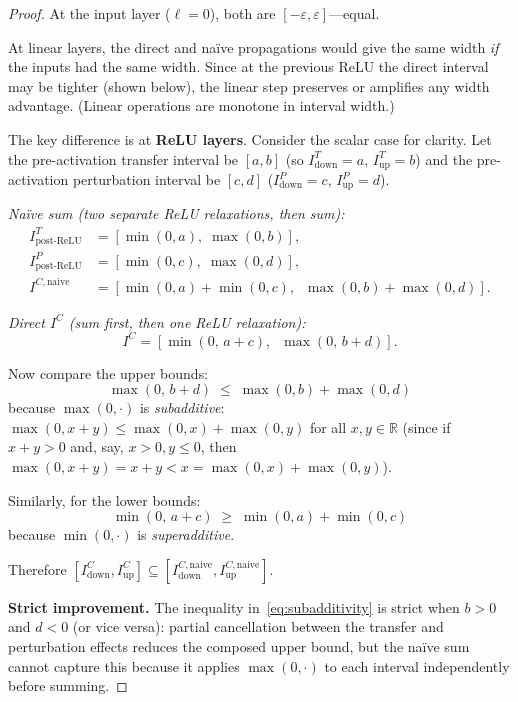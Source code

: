 \documentclass[11pt]{article}
\newcommand{\R}{\mathbb{R}}
\newcommand{\eps}{\varepsilon}
\newcommand{\layerl}{\ell}
\begin{document}
\begin{proof}
At the input layer ($\layerl = 0$), both are $[-\eps, \eps]$---equal.

At linear layers, the direct and na\"ive propagations would give the same
width \emph{if} the inputs had the same width. Since at the previous ReLU
the direct interval may be tighter (shown below), the linear step preserves
or amplifies any width advantage. (Linear operations are monotone in interval width.)

The key difference is at \textbf{ReLU layers}. Consider the scalar case
for clarity. Let the pre-activation transfer interval be $[a, b]$
(so $I^T_\text{down} = a$, $I^T_\text{up} = b$) and the pre-activation
perturbation interval be $[c, d]$ ($I^P_\text{down} = c$, $I^P_\text{up} = d$).

\emph{Na\"ive sum (two separate ReLU relaxations, then sum):}
\begin{align}
    I^T_\text{post-ReLU} &= [\min(0,a),\; \max(0,b)], \\
    I^P_\text{post-ReLU} &= [\min(0,c),\; \max(0,d)], \\
    I^{C,\text{naive}} &= [\min(0,a) + \min(0,c),\;\; \max(0,b) + \max(0,d)].
\end{align}

\emph{Direct $I^C$ (sum first, then one ReLU relaxation):}
\begin{equation}
    I^C = [\min(0,\, a+c),\;\; \max(0,\, b+d)].
\end{equation}

Now compare the upper bounds:
\begin{equation}
    \max(0,\, b+d)
    \;\le\;
    \max(0,b) + \max(0,d)
    \label{eq:subadditivity}
\end{equation}
because $\max(0,\cdot)$ is \emph{subadditive}: $\max(0, x+y) \le \max(0,x) + \max(0,y)$
for all $x, y \in \R$ (since if $x+y > 0$ and, say, $x > 0, y \le 0$, then
$\max(0,x+y) = x+y < x = \max(0,x) + \max(0,y)$).

Similarly, for the lower bounds:
\begin{equation}
    \min(0,\, a+c)
    \;\ge\;
    \min(0,a) + \min(0,c)
    \label{eq:superadditivity}
\end{equation}
because $\min(0,\cdot)$ is \emph{superadditive}.

Therefore $[I^C_\text{down}, I^C_\text{up}] \subseteq [I^{C,\text{naive}}_\text{down}, I^{C,\text{naive}}_\text{up}]$.

\textbf{Strict improvement.}\;
The inequality in~\eqref{eq:subadditivity} is strict when $b > 0$ and $d < 0$
(or vice versa): partial cancellation between the transfer and perturbation
effects reduces the composed upper bound, but the na\"ive sum cannot capture this
because it applies $\max(0,\cdot)$ to each interval independently before summing.


\end{proof}
\end{document}
